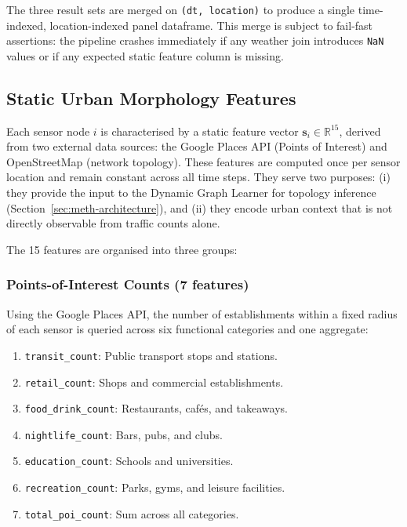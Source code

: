 \noindent The three result sets are merged on \texttt{(dt, location)} to produce a single time-indexed, location-indexed panel dataframe. This merge is subject to fail-fast assertions: the pipeline crashes immediately if any weather join introduces \texttt{NaN} values or if any expected static feature column is missing.

\subsection{Static Urban Morphology Features}
\label{subsec:meth-static-features}

Each sensor node $i$ is characterised by a static feature vector $\mathbf{s}_i \in \mathbb{R}^{15}$, derived from two external data sources: the Google Places API (Points of Interest) and OpenStreetMap (network topology). These features are computed once per sensor location and remain constant across all time steps. They serve two purposes: (i) they provide the input to the Dynamic Graph Learner for topology inference (Section~\ref{sec:meth-architecture}), and (ii) they encode urban context that is not directly observable from traffic counts alone.

The 15 features are organised into three groups:

\subsubsection{Points-of-Interest Counts (7 features)}

Using the Google Places API, the number of establishments within a fixed radius of each sensor is queried across six functional categories and one aggregate:

\begin{enumerate}
    \item \texttt{transit\_count}: Public transport stops and stations.
    \item \texttt{retail\_count}: Shops and commercial establishments.
    \item \texttt{food\_drink\_count}: Restaurants, cafés, and takeaways.
    \item \texttt{nightlife\_count}: Bars, pubs, and clubs.
    \item \texttt{education\_count}: Schools and universities.
    \item \texttt{recreation\_count}: Parks, gyms, and leisure facilities.
    \item \texttt{total\_poi\_count}: Sum across all categories.
\end{enumerate}


